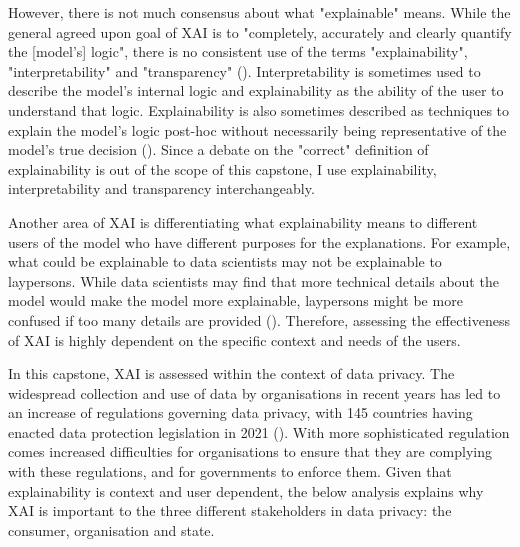 However, there is not much consensus about what "explainable" means. While the general agreed upon goal of XAI is to "completely, accurately and clearly quantify the [model's] logic", there is no consistent use of the terms "explainability", "interpretability" and "transparency" (\cite{danilevsky2020}). Interpretability is sometimes used to describe the model's internal logic and explainability as the ability of the user to understand that logic. Explainability is also sometimes described as techniques to explain the model's logic post-hoc without necessarily being representative of the model's true decision (\cite{rosenfeld2021}). Since a debate on the "correct" definition of explainability is out of the scope of this capstone, I use explainability, interpretability and transparency interchangeably.

Another area of XAI is differentiating what explainability means to different users of the model who have different purposes for the explanations. For example, what could be explainable to data scientists may not be explainable to laypersons. While data scientists may find that more technical details about the model would make the model more explainable, laypersons might be more confused if too many details are provided (\cite{rosenfeld2021}). Therefore, assessing the effectiveness of XAI is highly dependent on the specific context and needs of the users. 

In this capstone, XAI is assessed within the context of data privacy. The widespread collection and use of data by organisations in recent years has led to an increase of regulations governing data privacy, with 145 countries having enacted data protection legislation in 2021 (\cite{gstrein2022}). With more sophisticated regulation comes increased difficulties for organisations to ensure that they are complying with these regulations, and for governments to enforce them. Given that explainability is context and user dependent, the below analysis explains why XAI is important to the three different stakeholders in data privacy: the consumer, organisation and state.


